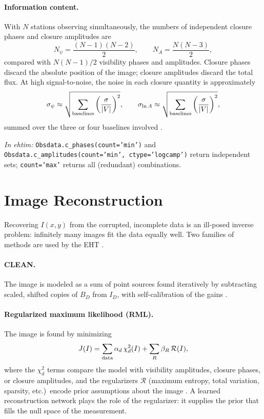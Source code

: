 \documentclass[11pt]{article}
\newcommand{\ehtimnote}[1]{%
  \par\smallskip\noindent
  \colorbox{gray!12}{\parbox{\dimexpr\linewidth-2\fboxsep}{\small\textit{In ehtim:} #1}}%
  \par\smallskip}
\begin{document}
\paragraph{Information content.} With $N$ stations observing simultaneously,
the numbers of independent closure phases and closure amplitudes are
\begin{equation}
N_\psi = \frac{(N-1)(N-2)}{2}, \qquad N_A = \frac{N(N-3)}{2},
\end{equation}
compared with $N(N-1)/2$ visibility phases and amplitudes. Closure phases
discard the absolute position of the image; closure amplitudes discard the
total flux. At high signal-to-noise, the noise in each closure quantity is
approximately
\begin{equation}
\sigma_\psi \approx \sqrt{\sum_{\rm baselines} \left(\frac{\sigma}{|V|}\right)^2},
\qquad
\sigma_{\ln A} \approx \sqrt{\sum_{\rm baselines} \left(\frac{\sigma}{|V|}\right)^2},
\end{equation}
summed over the three or four baselines involved \cite{Blackburn2020}.

\ehtimnote{\texttt{Obsdata.c\_phases(count='min')} and
\texttt{Obsdata.c\_amplitudes(count='min', ctype='logcamp')} return
independent sets; \texttt{count='max'} returns all (redundant) combinations.}

\section{Image Reconstruction}

Recovering $I(x,y)$ from the corrupted, incomplete data is an ill-posed
inverse problem: infinitely many images fit the data equally well. Two
families of methods are used by the EHT \cite{EHT2019IV}.

\paragraph{CLEAN.} The image is modeled as a sum of point sources found
iteratively by subtracting scaled, shifted copies of $B_D$ from $I_D$, with
self-calibration of the gains \cite{Hogbom1974}.

\paragraph{Regularized maximum likelihood (RML).} The image is found by
minimizing
\begin{equation}
J(I) = \sum_{\rm data} \alpha_d\,\chi^2_d(I) + \sum_R \beta_R\,\mathcal{R}(I),
\end{equation}
where the $\chi^2_d$ terms compare the model with visibility amplitudes,
closure phases, or closure amplitudes, and the regularizers $\mathcal{R}$
(maximum entropy, total variation, sparsity, etc.)\ encode prior assumptions
about the image \cite{Chael2016,Chael2018}. A learned reconstruction network
plays the role of the regularizer: it supplies the prior that fills the null
space of the measurement.
\end{document}
